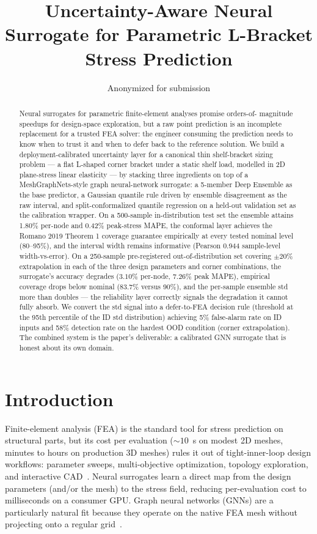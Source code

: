 \documentclass[11pt]{article}
\title{Uncertainty-Aware Neural Surrogate for Parametric L-Bracket Stress Prediction}
\author{Anonymized for submission}
\date{}
\begin{document}
\maketitle

\begin{abstract}
Neural surrogates for parametric finite-element analyses promise orders-of-
magnitude speedups for design-space exploration, but a raw point prediction
is an incomplete replacement for a trusted FEA solver: the engineer
consuming the prediction needs to know when to trust it and when to defer
back to the reference solution. We build a deployment-calibrated
uncertainty layer for a canonical thin shelf-bracket sizing problem --- a
flat L-shaped corner bracket under a static shelf load, modelled in 2D
plane-stress linear elasticity --- by stacking three ingredients on top of
a MeshGraphNets-style graph neural-network surrogate: a 5-member Deep
Ensemble as the base predictor, a Gaussian quantile rule driven by
ensemble disagreement as the raw interval, and split-conformalized
quantile regression on a held-out validation set as the calibration
wrapper. On a 500-sample in-distribution test set the ensemble attains
1.80\% per-node and 0.42\% peak-stress MAPE, the conformal layer achieves
the Romano 2019 Theorem 1 coverage guarantee empirically at every tested
nominal level (80--95\%), and the interval width remains informative
(Pearson 0.944 sample-level width-vs-error). On a 250-sample
pre-registered out-of-distribution set covering $\pm 20\%$ extrapolation
in each of the three design parameters and corner combinations, the
surrogate's accuracy degrades ($3.10\%$ per-node, $7.26\%$ peak MAPE),
empirical coverage drops below nominal (83.7\% versus 90\%), and the
per-sample ensemble std more than doubles --- the reliability layer
correctly signals the degradation it cannot fully absorb. We convert the
std signal into a defer-to-FEA decision rule (threshold at the 95th
percentile of the ID std distribution) achieving 5\% false-alarm rate on
ID inputs and 58\% detection rate on the hardest OOD condition (corner
extrapolation). The combined system is the paper's deliverable: a
calibrated GNN surrogate that is honest about its own domain.
\end{abstract}

\section{Introduction}
\label{sec:intro}

Finite-element analysis (FEA) is the standard tool for stress prediction on
structural parts, but its cost per evaluation ($\sim 10$~s on modest 2D
meshes, minutes to hours on production 3D meshes) rules it out of
tight-inner-loop design workflows: parameter sweeps, multi-objective
optimization, topology exploration, and interactive CAD~\cite{maurizi2022gnn,
pfaff2021meshgraphnets}. Neural surrogates learn a direct map from the
design parameters (and/or the mesh) to the stress field, reducing
per-evaluation cost to milliseconds on a consumer GPU. Graph neural
networks (GNNs) are a particularly natural fit because they operate on the
native FEA mesh without projecting onto a regular
grid~\cite{pfaff2021meshgraphnets, maurizi2022gnn, gladstone2024gnn}.
\end{document}
